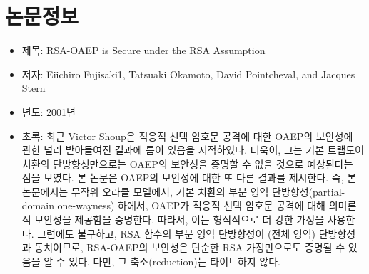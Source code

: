 \section{논문정보}

\begin{itemize}
	\item 제목: RSA-OAEP is Secure under the RSA Assumption
	\item 저자: Eiichiro Fujisaki1, Tatsuaki Okamoto, David Pointcheval, and Jacques Stern
	\item 년도: 2001년
	\item 초록: 최근 Victor Shoup은 적응적 선택 암호문 공격에 대한 OAEP의 보안성에 관한 널리
	받아들여진 결과에 틈이 있음을 지적하였다. 더욱이, 그는 기본 트랩도어 치환의
	단방향성만으로는 OAEP의 보안성을 증명할 수 없을 것으로 예상된다는 점을 보였다.
	본 논문은 OAEP의 보안성에 대한 또 다른 결과를 제시한다. 즉, 본 논문에서는 무작위
	오라클 모델에서, 기본 치환의 부분 영역 단방향성(partial-domain one-wayness)
	하에서, OAEP가 적응적 선택 암호문 공격에 대해 의미론적 보안성을 제공함을
	증명한다. 따라서, 이는 형식적으로 더 강한 가정을 사용한다. 그럼에도 불구하고,
	RSA 함수의 부분 영역 단방향성이 (전체 영역) 단방향성과 동치이므로, RSA-OAEP의
	보안성은 단순한 RSA 가정만으로도 증명될 수 있음을 알 수 있다. 다만, 그
	축소(reduction)는 타이트하지 않다.
\end{itemize}